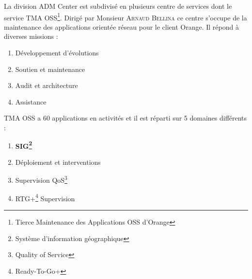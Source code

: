 La division ADM Center est subdivisé en plusieurs centre de services dont le service TMA OSS\footnote{Tierce Maintenance des Applications OSS d’Orange}.
Dirigé par Monsieur \textsc{Arnaud Bellina} ce centre s'occupe de la maintenance des applications orientée réseau pour le client Orange.
Il répond à diverses missions :

\begin{enumerate}
\item Développement d'évolutions
\item Soutien et maintenance
\item Audit et architecture
\item Assistance\\
\end{enumerate}

TMA OSS a 60 applications en activités et il est réparti sur 5 domaines différents :

\begin{enumerate}
\item \textbf{SIG\footnote{Système d’information géographique }}
\item Déploiement et interventions
\item Supervision QoS\footnote{Quality of Service}
\item RTG+\footnote{Ready-To-Go+} Supervision\\
\end{enumerate}

